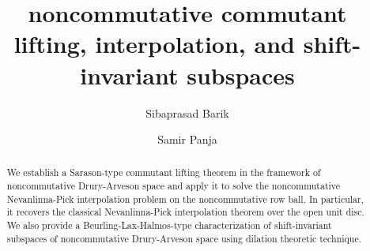 \documentclass[12pt]{amsart}%
\numberwithin{equation}{section}
\begin{document}
\title[nc commutant lifting, interpolation, and shift-invariant subspaces]{noncommutative commutant lifting, interpolation, and shift-invariant subspaces}

\author[Barik]{Sibaprasad Barik}
\address{Statistics and Mathematics Unit, Indian Statistical Institute, 8th Mile, Mysore Road, Bengaluru, 560059, India}

	

	\author[Panja]{Samir Panja}
\address{Statistics and Mathematics Unit, Indian Statistical Institute, 8th Mile, Mysore Road, Bengaluru, 560059, India} 

	\begin{abstract}
We establish a Sarason-type commutant lifting theorem in the framework of noncommutative Drury-Arveson space and apply it to solve the noncommutative Nevanlinna-Pick interpolation problem on the noncommutative row ball. In particular, it recovers the classical Nevanlinna-Pick interpolation theorem over the open unit disc.  We also provide a Beurling-Lax-Halmos-type characterization of shift-invariant subspaces of noncommutative Drury-Arveson space using dilation theoretic technique.
	\end{abstract}
    
\maketitle 
\end{document}
